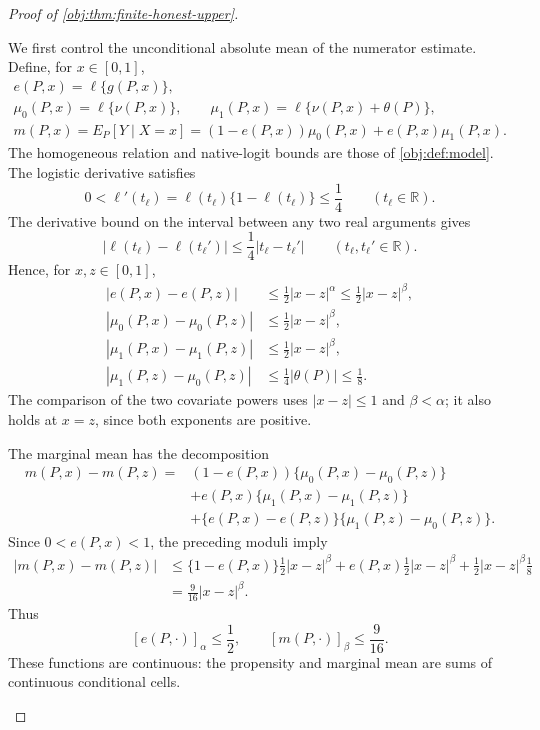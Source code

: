 \begin{proof}[Proof of \cref{obj:thm:finite-honest-upper}]
\begin{enumerate}
We first control the unconditional absolute mean of the numerator estimate. Define, for \(x\in[0,1]\),
\[
\begin{gathered}
e(P,x)=\ell\{g(P,x)\},\\
\mu_0(P,x)=\ell\{\nu(P,x)\},
\qquad
\mu_1(P,x)=\ell\{\nu(P,x)+\theta(P)\},\\
m(P,x)=E_P[Y\mid X=x]
=(1-e(P,x))\mu_0(P,x)+e(P,x)\mu_1(P,x).
\end{gathered}
\]
The homogeneous relation and native-logit bounds are those of
\cref{obj:def:model}. The logistic derivative satisfies
\[
0<\ell'(t_{\ell})
=\ell(t_{\ell})\{1-\ell(t_{\ell})\}
\le\frac14
\qquad(t_{\ell}\in\mathbb R).
\]
The derivative bound on the interval between any two real arguments gives
\[
|\ell(t_{\ell})-\ell(t_{\ell}')|
\le\frac14|t_{\ell}-t_{\ell}'|
\qquad(t_{\ell},t_{\ell}'\in\mathbb R).
\]
Hence, for \(x,z\in[0,1]\),
\[
\begin{aligned}
|e(P,x)-e(P,z)|
&\le\frac12|x-z|^\alpha
\le\frac12|x-z|^\beta,\\
|\mu_0(P,x)-\mu_0(P,z)|
&\le\frac12|x-z|^\beta,\\
|\mu_1(P,x)-\mu_1(P,z)|
&\le\frac12|x-z|^\beta,\\
|\mu_1(P,z)-\mu_0(P,z)|
&\le\frac14|\theta(P)|\le\frac18.
\end{aligned}
\]
The comparison of the two covariate powers uses
\(|x-z|\le1\) and \(\beta<\alpha\); it also holds at \(x=z\), since both exponents are positive.

The marginal mean has the decomposition
\[
\begin{aligned}
m(P,x)-m(P,z)
={}&(1-e(P,x))\{\mu_0(P,x)-\mu_0(P,z)\}\\
&+e(P,x)\{\mu_1(P,x)-\mu_1(P,z)\}\\
&+\{e(P,x)-e(P,z)\}
  \{\mu_1(P,z)-\mu_0(P,z)\}.
\end{aligned}
\]
Since \(0<e(P,x)<1\), the preceding moduli imply
\[
\begin{aligned}
|m(P,x)-m(P,z)|
&\le
\{1-e(P,x)\}\frac12|x-z|^\beta
+e(P,x)\frac12|x-z|^\beta
+\frac12|x-z|^\beta\frac18\\
&=\frac9{16}|x-z|^\beta.
\end{aligned}
\]
Thus
\[
[e(P,\cdot)]_\alpha\le\frac12,
\qquad
[m(P,\cdot)]_\beta\le\frac9{16}.
\]
These functions are continuous: the propensity and marginal mean are sums of continuous conditional cells.


\end{enumerate}
\end{proof}
